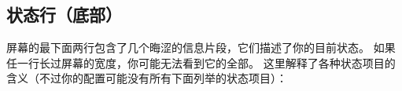 \documentclass[a4paper, 10pt]{article}
\begin{document}
\subsection*{状态行（底部）}

屏幕的最下面两行包含了几个晦涩的信息片段，它们描述了你的目前状态。
如果任一行长过屏幕的宽度，你可能无法看到它的全部。
这里解释了各种状态项目的含义（不过你的配置可能没有所有下面列举的状态项目）：
\end{document}
